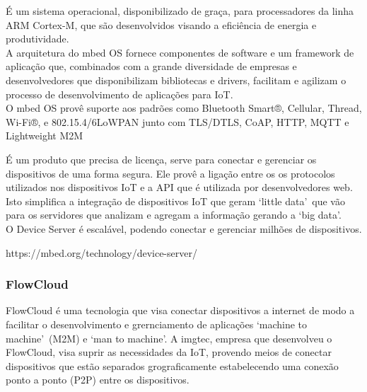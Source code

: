 É um sistema operacional, disponibilizado de graça, para processadores da linha ARM Cortex-M, que são desenvolvidos visando a eficiência de energia e produtividade.\\
A arquitetura do mbed OS fornece componentes de software e um framework de aplicação que, combinados com a grande diversidade de empresas e desenvolvedores que disponibilizam bibliotecas e drivers, facilitam e agilizam o processo de desenvolvimento de aplicações para IoT.\\
O mbed OS provê suporte aos padrões como Bluetooth Smart®, Cellular, Thread, Wi-Fi®, e 802.15.4/6LoWPAN junto com TLS/DTLS, CoAP, HTTP, MQTT e Lightweight M2M

É um produto que precisa de licença, serve para conectar e gerenciar os dispositivos de uma forma segura. Ele provê a ligação entre os os protocolos utilizados nos dispositivos IoT e a API que é utilizada por desenvolvedores web. Isto simplifica a integração de dispositivos IoT que geram \lq little data\rq\ que vão para os servidores que analizam e agregam a informação gerando a \lq big data\rq.\\
O Device Server é escalável, podendo conectar e gerenciar milhões de dispositivos.

https://mbed.org/technology/device-server/ \\

\subsubsection{FlowCloud}
FlowCloud \cite{flowcloud} é uma tecnologia que visa conectar dispositivos a internet de modo a facilitar o desenvolvimento e grernciamento de aplicações \lq machine to machine\rq\ (M2M) e \lq man to machine\rq. A imgtec, empresa que desenvolveu o FlowCloud, visa suprir as necessidades da IoT, provendo meios de conectar dispositivos que estão separados grograficamente estabelecendo uma conexão ponto a ponto (P2P) entre os dispositivos.

